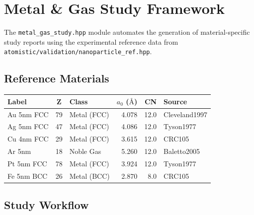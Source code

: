 \documentclass[11pt, a4paper, oneside]{article}
\newcommand{\file}[1]{\texttt{#1}}
\newcommand{\type}[1]{\texttt{#1}}
\newcommand{\Ang}{\text{\AA}}
\begin{document}
\newpage
\section{Metal \& Gas Study Framework}
\label{sec:metal-gas}

The \type{metal\_gas\_study.hpp} module automates the generation of
material-specific study reports using the experimental reference data
from \file{atomistic/validation/nanoparticle\_ref.hpp}.

\subsection{Reference Materials}
\label{sec:reference-materials}

\begin{center}
\begin{tabular}{lclrrl}
  \toprule
  \textbf{Label} & \textbf{Z} & \textbf{Class} & $a_0$ ($\Ang$)
    & \textbf{CN} & \textbf{Source} \\
  \midrule
  Au 5nm FCC & 79 & Metal (FCC) & 4.078 & 12.0 & Cleveland1997 \\
  Ag 5nm FCC & 47 & Metal (FCC) & 4.086 & 12.0 & Tyson1977 \\
  Cu 4nm FCC & 29 & Metal (FCC) & 3.615 & 12.0 & CRC105 \\
  Ar 5nm     & 18 & Noble Gas   & 5.260 & 12.0 & Baletto2005 \\
  Pt 5nm FCC & 78 & Metal (FCC) & 3.924 & 12.0 & Tyson1977 \\
  Fe 5nm BCC & 26 & Metal (BCC) & 2.870 &  8.0 & CRC105 \\
  \bottomrule
\end{tabular}
\end{center}

\subsection{Study Workflow}
\label{sec:study-workflow}
\end{document}
